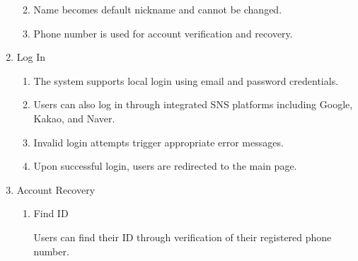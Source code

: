 \documentclass[conference]{IEEEtran}
\begin{document}
\begin{enumerate}[label=\arabic*]
\begin{enumerate}[label=\arabic*)]
        \vspace{0.5em}

        \item Name becomes default nickname and cannot be changed. 

        \vspace{0.5em}

        \item Phone number is used for account verification and recovery.
    \end{enumerate}

    \vspace{1em}

    \item Log In\par
    \vspace{0.3em}

    \begin{enumerate}[label=\arabic*)]
        \item The system supports local login using email and password credentials.

        \vspace{0.5em}

        \item Users can also log in through integrated SNS platforms including Google, Kakao, and Naver. 

        \vspace{0.5em}

        \item Invalid login attempts trigger appropriate error messages. 

        \vspace{0.5em}

        \item Upon successful login, users are redirected to the main page.
        
    \end{enumerate}

    \vspace{1em}

    \item Account Recovery\par
    \vspace{0.3em}

    \begin{enumerate}[label=\arabic*)]
        \item Find ID\par
        \vspace{0.3em}
        Users can find their ID through verification of their registered phone number.


\end{enumerate}
\end{enumerate}
\end{document}
